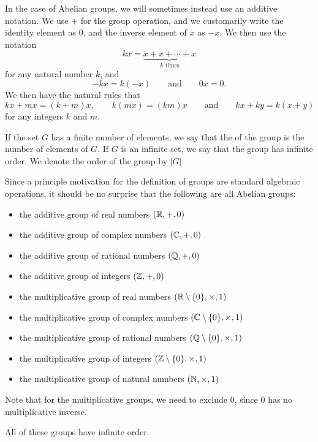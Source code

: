 In the case of Abelian groups, we will sometimes instead use an additive
notation.  We use $+$ for the group operation, and we customarily write the
identity element as $0$, and the inverse element of $x$ as $-x$. We then use
the notation
\[
  kx = \underbrace{x + x + \cdots + x}_{k\text{ times}}
\]
for any natural number $k$, and
\[
  -kx = k(-x) \qquad \text{and}  \qquad 0x = 0.
\]
We then have the natural rules that
\[
  kx + mx = (k + m)x, \qquad k(mx) = (km)x \qquad \text{and} \qquad kx + ky
= k(x+y)
\]
for any integers $k$ and $m$.

If the set $G$ has a finite number of elements, we say that the
 of the group is the number of elements of $G$. 
If $G$ is an infinite set, we say that the group has infinite order.  We denote
the order of the group by $|G|$.

\begin{example}
  Since a principle motivation for the definition of groups are standard
  algebraic operations, it should be no surprise that the following are all
  Abelian groups:
  \begin{itemize}
    \item the additive group of real numbers $(\mathbb{R}, +, 0)$
    \item the additive group of complex numbers $(\mathbb{C}, +, 0)$
    \item the additive group of rational numbers $(\mathbb{Q}, +, 0)$
    \item the additive group of integers $(\mathbb{Z}, +, 0)$
    \item the multiplicative group of real numbers $(\mathbb{R} \setminus \{0\}, \times, 1)$
    \item the multiplicative group of complex numbers $(\mathbb{C} \setminus \{0\}, \times, 1)$
    \item the multiplicative group of rational numbers $(\mathbb{Q} \setminus \{0\}, \times, 1)$
    \item the multiplicative group of integers $(\mathbb{Z} \setminus \{0\}, \times, 1)$
    \item the multiplicative group of natural numbers $(\mathbb{N}, \times, 1)$
  \end{itemize}
  Note that for the multiplicative groups, we need to exclude $0$, since $0$
  has no multiplicative inverse.
  
  All of these groups have infinite order.
\end{example}

